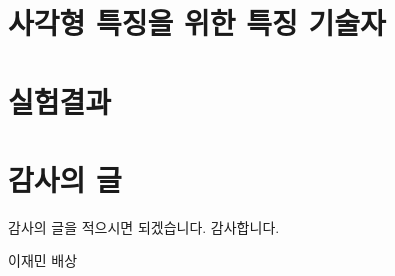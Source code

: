 \documentclass[master,korean,final]{cbnu-ecs}
\begin{document}
\chapter{사각형 특징을 위한 특징 기술자}
\chapter{실험결과}


%
%
%


\chapter*{감사의 글}

감사의 글을 적으시면 되겠습니다.
감사합니다.

\begin{flushright}
\vspace{1cm}
이재민 배상
\end{flushright}
\end{document}
